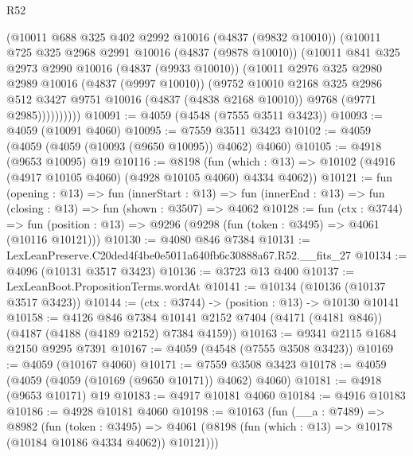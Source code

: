 \begin{lexlean}{R52}
\begin{coremodule}
            (@10011
              @688
              @325
              @402
              @2992
              @10016
              (@4837 (@9832 @10010))
              (@10011
                @725
                @325
                @2968
                @2991
                @10016
                (@4837 (@9878 @10010))
                (@10011
                  @841
                  @325
                  @2973
                  @2990
                  @10016
                  (@4837 (@9933 @10010))
                  (@10011
                    @2976
                    @325
                    @2980
                    @2989
                    @10016
                    (@4837 (@9997 @10010))
                    (@9752
                      @10010
                      @2168
                      @325
                      @2986
                      @512
                      @3427
                      @9751
                      @10016
                      (@4837 (@4838 @2168 @10010))
                      @9768
                      (@9771 @2985))))))))))
@10091 := @4059 (@4548 (@7555 @3511 @3423))
@10093 := @4059 (@10091 @4060)
@10095 := @7559 @3511 @3423
@10102 := @4059 (@4059 (@4059 (@10093 (@9650 @10095)) @4062) @4060)
@10105 := @4918 (@9653 @10095) @19
@10116 := @8198
    (fun (which : @13) => @10102 (@4916 (@4917 @10105 @4060) (@4928 @10105 @4060) @4334 @4062))
@10121 := fun (opening : @13) =>
  fun (innerStart : @13) =>
  fun (innerEnd : @13) => fun (closing : @13) => fun (shown : @3507) => @4062
@10128 := fun (ctx : @3744) =>
  fun (position : @13) => @9296 (@9298 (fun (token : @3495) => @4061 (@10116 @10121)))
@10130 := @4080 @846 @7384
@10131 := LexLeanPreserve.C20ded4f4be0e5011a640fb6c30888a67.R52.__fits_27
@10134 := @4096 (@10131 @3517 @3423)
@10136 := @3723 @13 @400
@10137 := LexLeanBoot.PropositionTerms.wordAt
@10141 := @10134 (@10136 (@10137 @3517 @3423))
@10144 := (ctx : @3744) -> (position : @13) -> @10130 @10141
@10158 := @4126
    @846
    @7384
    @10141
    @2152
    @7404
    (@4171 (@4181 @846))
    (@4187 (@4188 (@4189 @2152) @7384 @4159))
@10163 := @9341 @2115 @1684 @2150 @9295 @7391
@10167 := @4059 (@4548 (@7555 @3508 @3423))
@10169 := @4059 (@10167 @4060)
@10171 := @7559 @3508 @3423
@10178 := @4059 (@4059 (@4059 (@10169 (@9650 @10171)) @4062) @4060)
@10181 := @4918 (@9653 @10171) @19
@10183 := @4917 @10181 @4060
@10184 := @4916 @10183
@10186 := @4928 @10181 @4060
@10198 := @10163
    (fun (__a : @7489) =>
    @8982
      (fun (token : @3495) =>
      @4061 (@8198 (fun (which : @13) => @10178 (@10184 @10186 @4334 @4062)) @10121)))

\end{coremodule}
\end{lexlean}

